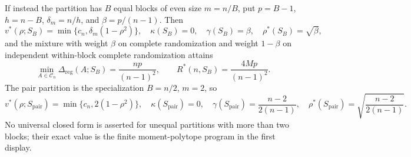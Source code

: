 If instead the partition has \(B\) equal blocks of even size \(m=n/B\), put \(p=B-1\), \(h=n-B\), \(\delta_m=n/h\), and \(\beta=p/(n-1)\).  Then
\[
v^*(\rho;S_B)=\min\{c_n,\delta_m(1-\rho^2)\},
\quad
\kappa(S_B)=0,
\quad
\gamma(S_B)=\beta,
\quad
\rho^*(S_B)=\sqrt\beta,
\]
and the mixture with weight \(\beta\) on complete randomization and weight \(1-\beta\) on independent within-block complete randomization attains
\[
\min_{A\in\mathcal C_n}\Delta_{\mathrm{reg}}(A;S_B)
=\frac{np}{(n-1)^2},
\qquad
R^*(n,S_B)=\frac{4Mp}{(n-1)^2}.
\]
The pair partition is the specialization \(B=n/2\), \(m=2\), so
\[
v^*(\rho;S_{\mathrm{pair}})=\min\{c_n,2(1-\rho^2)\},
\quad
\kappa(S_{\mathrm{pair}})=0,
\quad
\gamma(S_{\mathrm{pair}})=\frac{n-2}{2(n-1)},
\quad
\rho^*(S_{\mathrm{pair}})=\sqrt{\frac{n-2}{2(n-1)}}.
\]
No universal closed form is asserted for unequal partitions with more than two blocks; their exact value is the finite moment-polytope program in the first display.